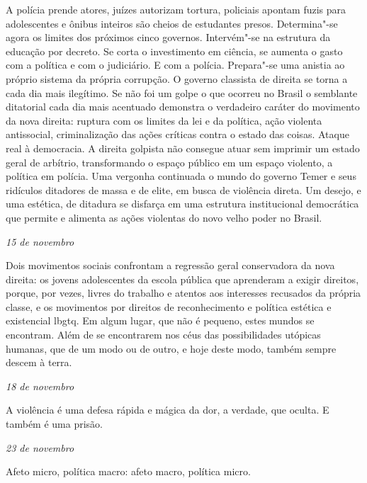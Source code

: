 A polícia prende atores, juízes autorizam tortura, policiais apontam
fuzis para adolescentes e ônibus inteiros são cheios de estudantes
presos. Determina"-se agora os limites dos próximos cinco governos.
Intervém"-se na estrutura da educação por decreto. Se corta o
investimento em ciência, se aumenta o gasto com a política e com o
judiciário. E com a polícia. Prepara"-se uma anistia ao próprio sistema
da própria corrupção. O governo classista de direita se torna a cada dia
mais ilegítimo. Se não foi um golpe o que ocorreu no Brasil o semblante
ditatorial cada dia mais acentuado demonstra o verdadeiro caráter do
movimento da nova direita: ruptura com os limites da lei e da política,
ação violenta antissocial, criminalização das ações críticas contra o
estado das coisas. Ataque real à democracia. A direita golpista não
consegue atuar sem imprimir um estado geral de arbítrio, transformando o
espaço público em um espaço violento, a política em polícia. Uma
vergonha continuada o mundo do governo Temer e seus ridículos ditadores
de massa e de elite, em busca de violência direta. Um desejo, e uma
estética, de ditadura se disfarça em uma estrutura institucional
democrática que permite e alimenta as ações violentas do novo velho
poder no Brasil.

\begin{flushright}
\emph{15 de novembro}
\end{flushright}

Dois movimentos sociais confrontam a regressão geral conservadora da
nova direita: os jovens adolescentes da escola pública que aprenderam a
exigir direitos, porque, por vezes, livres do trabalho e atentos aos
interesses recusados da própria classe, e os movimentos por direitos de
reconhecimento e política estética e existencial lbgtq. Em algum lugar,
que não é pequeno, estes mundos se encontram. Além de se encontrarem nos
céus das possibilidades utópicas humanas, que de um modo ou de outro, e
hoje deste modo, também sempre descem à terra.

\begin{flushright}
\emph{18 de novembro}
\end{flushright}

A violência é uma defesa rápida e mágica da dor, a verdade, que oculta.
E também é uma prisão.

\begin{flushright}
\emph{23 de novembro}
\end{flushright}

Afeto micro, política macro: afeto macro, política micro.

